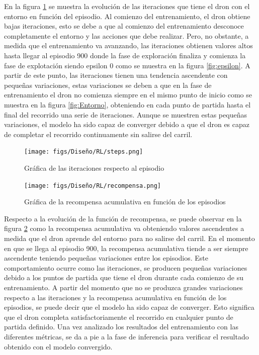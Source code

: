 En la figura \ref{fig:iteraciones} 
se muestra la evolución de las iteraciones que tiene el dron con el entorno en función del episodio. Al comienzo del entrenamiento, el dron obtiene bajas iteraciones, esto se debe a que 
al comienzo del entrenamiento desconoce completamente el entorno y las acciones que debe realizar. Pero, no obstante, a medida que el entrenamiento va avanzando, 
las iteraciones obtienen valores altos hasta llegar al episodio
900 donde la fase de exploración finaliza y comienza la fase de explotación siendo epsilon 0 como se muestra en la figura \ref{fig:epsilon}. A partir de este punto, las iteraciones tienen 
una tendencia ascendente con pequeñas variaciones, estas variaciones se deben a que en la fase de entrenamiento el dron no comienza siempre en el mismo punto de inicio como 
se muestra en la figura \ref{fig:Entorno}, obteniendo en cada punto de partida hasta el final del recorrido una serie de iteraciones. Aunque se muestren estas pequeñas variaciones, el modelo
ha sido capaz de converger debido a que el dron es capaz de completar el recorrido continuamente sin salirse del carril.

\begin{figure} [H]
  \begin{center}
    \texttt{[image: figs/Diseño/RL/steps.png]}
  \end{center}
  \caption{Gráfica de las iteraciones respecto al episodio}
  \label{fig:iteraciones}
  \vspace{-1.5em}
\end{figure}

\begin{figure} [H]
  \begin{center}
    \texttt{[image: figs/Diseño/RL/recompensa.png]}
  \end{center}
  \caption{Gráfica de la recompensa acumulativa en función de los episodios}
  \label{fig:recompensa}
  \vspace{-1.5em}
\end{figure}

Respecto a la evolución de la función de recompensa, se puede observar en la figura \ref{fig:recompensa} como la recompensa acumulativa va obteniendo valores ascendentes a medida que el dron 
aprende del entorno para no salirse del carril. En el momento en que se llega al episodio 900, la recompensa acumulativa tiende a ser siempre ascendente teniendo pequeñas variaciones entre los 
episodios. Este comportamiento ocurre como las iteraciones, se producen pequeñas variaciones debido a los puntos de partida que tiene el dron durante cada comienzo de su entrenamiento. A partir 
del momento 
que no se produzca grandes variaciones respecto a las iteraciones y la recompensa acumulativa en función de los episodios, se puede decir que el modelo ha sido capaz de converger. Esto significa
que el dron completa satisfactoriamente el recorrido en cualquier punto de partida definido. Una vez analizado los resultados del entrenamiento con las diferentes métricas, se da a pie a la 
fase de inferencia para verificar el resultado obtenido con el modelo convergido.


